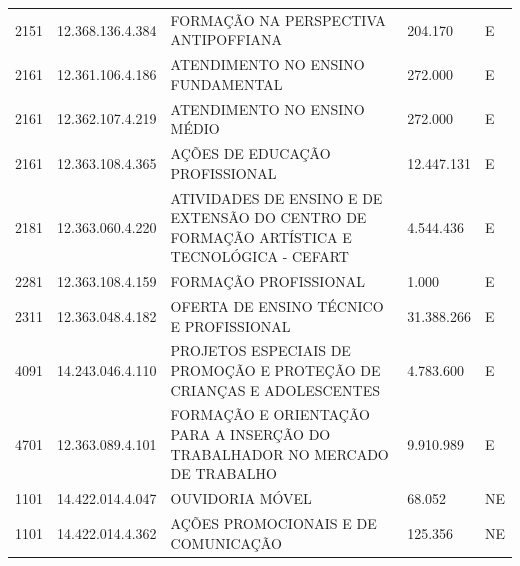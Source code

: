 \documentclass{article}
\begin{document}
\begin{longtable}[c]{m{1cm}|m{2cm}|m{10cm}|m{2cm}|m{1cm}}
\multicolumn{1}{C{1cm}|}{2151} & \multicolumn{1}{C{2cm}|}{12.368.136.4.384} & \multicolumn{1}{L{10cm}|}{FORMAÇÃO NA PERSPECTIVA ANTIPOFFIANA} & \multicolumn{1}{R{2cm}|}{204.170} & \multicolumn{1}{C{1cm}}{E} \\
\multicolumn{1}{C{1cm}|}{2161} & \multicolumn{1}{C{2cm}|}{12.361.106.4.186} & \multicolumn{1}{L{10cm}|}{ATENDIMENTO NO ENSINO FUNDAMENTAL} & \multicolumn{1}{R{2cm}|}{272.000} & \multicolumn{1}{C{1cm}}{E} \\
\multicolumn{1}{C{1cm}|}{2161} & \multicolumn{1}{C{2cm}|}{12.362.107.4.219} & \multicolumn{1}{L{10cm}|}{ATENDIMENTO NO ENSINO MÉDIO} & \multicolumn{1}{R{2cm}|}{272.000} & \multicolumn{1}{C{1cm}}{E} \\
\multicolumn{1}{C{1cm}|}{2161} & \multicolumn{1}{C{2cm}|}{12.363.108.4.365} & \multicolumn{1}{L{10cm}|}{AÇÕES DE EDUCAÇÃO PROFISSIONAL} & \multicolumn{1}{R{2cm}|}{12.447.131} & \multicolumn{1}{C{1cm}}{E} \\
\multicolumn{1}{C{1cm}|}{2181} & \multicolumn{1}{C{2cm}|}{12.363.060.4.220} & \multicolumn{1}{L{10cm}|}{ATIVIDADES DE ENSINO E DE EXTENSÃO DO CENTRO DE FORMAÇÃO ARTÍSTICA E TECNOLÓGICA - CEFART} & \multicolumn{1}{R{2cm}|}{4.544.436} & \multicolumn{1}{C{1cm}}{E} \\
\multicolumn{1}{C{1cm}|}{2281} & \multicolumn{1}{C{2cm}|}{12.363.108.4.159} & \multicolumn{1}{L{10cm}|}{FORMAÇÃO PROFISSIONAL} & \multicolumn{1}{R{2cm}|}{1.000} & \multicolumn{1}{C{1cm}}{E} \\
\multicolumn{1}{C{1cm}|}{2311} & \multicolumn{1}{C{2cm}|}{12.363.048.4.182} & \multicolumn{1}{L{10cm}|}{OFERTA DE ENSINO TÉCNICO E PROFISSIONAL} & \multicolumn{1}{R{2cm}|}{31.388.266} & \multicolumn{1}{C{1cm}}{E} \\
\multicolumn{1}{C{1cm}|}{4091} & \multicolumn{1}{C{2cm}|}{14.243.046.4.110} & \multicolumn{1}{L{10cm}|}{PROJETOS ESPECIAIS DE PROMOÇÃO E PROTEÇÃO DE CRIANÇAS E ADOLESCENTES} & \multicolumn{1}{R{2cm}|}{4.783.600} & \multicolumn{1}{C{1cm}}{E} \\
\multicolumn{1}{C{1cm}|}{4701} & \multicolumn{1}{C{2cm}|}{12.363.089.4.101} & \multicolumn{1}{L{10cm}|}{FORMAÇÃO E ORIENTAÇÃO PARA A INSERÇÃO DO TRABALHADOR NO MERCADO DE TRABALHO} & \multicolumn{1}{R{2cm}|}{9.910.989} & \multicolumn{1}{C{1cm}}{E} \\
\multicolumn{1}{C{1cm}|}{1101} & \multicolumn{1}{C{2cm}|}{14.422.014.4.047} & \multicolumn{1}{L{10cm}|}{OUVIDORIA MÓVEL} & \multicolumn{1}{R{2cm}|}{68.052} & \multicolumn{1}{C{1cm}}{NE} \\
\multicolumn{1}{C{1cm}|}{1101} & \multicolumn{1}{C{2cm}|}{14.422.014.4.362} & \multicolumn{1}{L{10cm}|}{AÇÕES PROMOCIONAIS E DE COMUNICAÇÃO} & \multicolumn{1}{R{2cm}|}{125.356} & \multicolumn{1}{C{1cm}}{NE} \\

\end{longtable}
\end{document}
